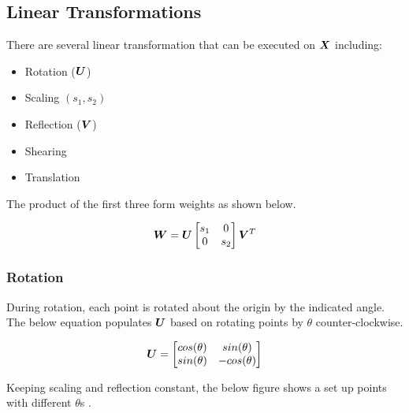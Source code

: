 \subsection{Linear Transformations}
There are several linear transformation that can be executed on $\bm{X}$ including:

\begin{itemize}
\tightlist
\item
Rotation (\(\bm{U}\))

\item
Scaling \((s_1, s_2)\)

\item
Reflection (\(\bm{V}\))
\item
Shearing
\item
Translation
\end{itemize}

The product of the first three form weights as shown below.

\[
\bm{W} = \bm{U}
\begin{bmatrix}
    s_1 & 0 \\
    0 & s_2 
\end{bmatrix}
\bm{V}^T
\]


\subsubsection{Rotation}
During rotation, each point is rotated about the origin by the indicated angle. 
The below equation populates $\bm{U}$ based on rotating points by \(\theta\) counter-clockwise.

\[
\bm{U} = 
\begin{bmatrix}
    cos(\theta) & sin(\theta)\\
    sin(\theta) & -cos(\theta)
\end{bmatrix}
\]

Keeping scaling and reflection constant, the below figure shows a set up points with different  \(\theta\)s .

